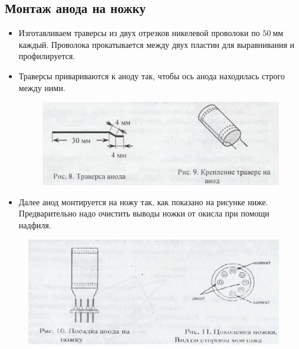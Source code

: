 \documentclass[a4paper]{article}
\begin{document}
\subsection{Монтаж анода на ножку}
\begin{itemize}
    \item Изготавливаем траверсы из двух отрезков никелевой проволоки по $50~\text{мм}$ каждый. Проволока прокатывается между двух пластин для выравнивания и профилируется.
    \item Траверсы привариваются к аноду так, чтобы ось анода находилась строго между ними.
\begin{figure}[h]
\begin{center}
\includegraphics[width=13cm]{траверса анода.jpg}
\end{center}
\end{figure}
    \item Далее анод монтируется на ножу так, как показано на рисунке ниже. Предварительно надо очистить выводы ножки от окисла при помощи надфиля.
\end{itemize}
\begin{figure}[h]
\begin{center}
\includegraphics[width=13cm]{посадка на ножку.jpg}
\end{center}
\end{figure}
\newpage
\end{document}
